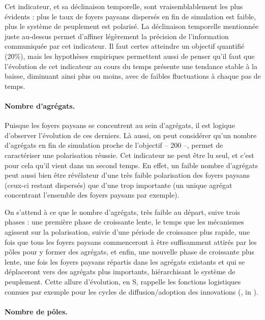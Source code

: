 Cet indicateur, et sa déclinaison temporelle, sont vraisemblablement les plus évidents :
plus le taux de foyers paysans dispersés en fin de simulation est faible, plus le système de peuplement est polarisé.
La \og déclinaison temporelle\fg{} mentionnée juste au-dessus permet d'affiner légèrement la précision de l'information communiquée par cet indicateur.
Il faut certes atteindre un objectif quantifié (20\%), mais les hypothèses empiriques permettent aussi de penser qu'il faut que l'évolution de cet indicateur au cours du temps présente une tendance stable à la baisse, diminuant ainsi plus ou moins, avec de faibles fluctuations à chaque pas de temps.

\paragraph{Nombre d'agrégats.}

Puisque les foyers paysans se concentrent au sein d'agrégats, il est logique d'observer l'évolution de ces derniers.
Là aussi, on peut considérer qu'un nombre d'agrégats en fin de simulation proche de l'objectif -- 200 --, permet de caractériser une polarisation réussie.
Cet indicateur ne peut être lu seul, et c'est pour cela qu'il vient dans un second temps.
En effet, un faible nombre d'agrégats peut aussi bien être révélateur d'une très faible polarisation des foyers paysans (ceux-ci restant dispersés) que d'une trop importante (un unique agrégat concentrant l'ensemble des foyers paysans par exemple).

On s'attend à ce que le nombre d'agrégats, très faible au départ, suive trois phases :
	une première phase de croissante lente, le temps que les mécanismes agissent sur la polarisation, suivie d'une période de croissance plus rapide, une fois que tous les foyers paysans commenceront à être suffisamment attirés par les pôles pour y former des agrégats, et enfin, une nouvelle phase de croissante plus lente, une fois les foyers paysans répartis dans les agrégats existants et qui se déplaceront vers des agrégats plus importants, hiérarchisant le système de peuplement.
Cette allure d'évolution, en \og S\fg{}, rappelle les fonctions logistiques connues par exemple pour les cycles de diffusion/adoption des innovations (\cite{hagerstrand1952propagation}, in \cite[28]{daude_modelisation_2002}).

\paragraph{Nombre de pôles.}\label{par:nb-poles}

